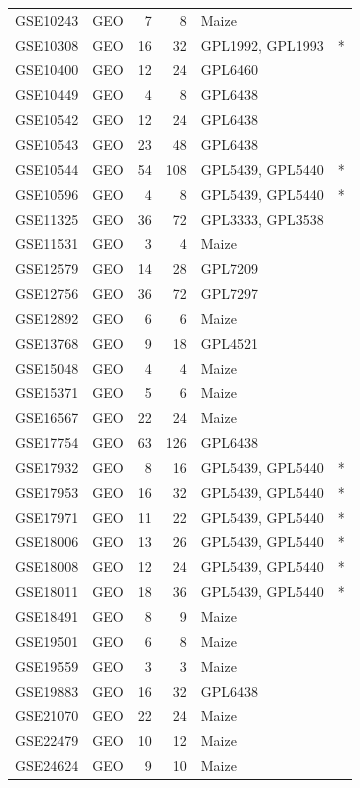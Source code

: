 \begin{ThreePartTable}
\begin{footnotesize}
\begin{longtable}{@{}|>{\centering\arraybackslash}p{2.5cm} | 
>{\centering\arraybackslash}p{1.5cm} rr 
>{\scriptsize\raggedright}p{2.5cm} c |@{}}
GSE10243 & GEO & 7 & 8 & Maize\tnote{2} & \\
GSE10308 & GEO & 16 & 32 & GPL1992, GPL1993 & * \\
GSE10400 & GEO & 12 & 24 & GPL6460 & \\
GSE10449 & GEO & 4 & 8 & GPL6438 & \\
GSE10542 & GEO & 12 & 24 & GPL6438 & \\
GSE10543 & GEO & 23 & 48 & GPL6438 & \\
GSE10544 & GEO & 54 & 108 & GPL5439, GPL5440 & * \\
GSE10596 & GEO & 4 & 8 & GPL5439, GPL5440 & * \\
GSE11325 & GEO & 36 & 72 & GPL3333, GPL3538 & \\
GSE11531 & GEO & 3 & 4 & Maize\tnote{2} & \\
GSE12579 & GEO & 14 & 28 & GPL7209 & \\
GSE12756 & GEO & 36 & 72 & GPL7297 & \\
GSE12892 & GEO & 6 & 6 & Maize\tnote{2} & \\
GSE13768 & GEO & 9 & 18 & GPL4521 & \\
GSE15048 & GEO & 4 & 4 & Maize\tnote{2} & \\
GSE15371 & GEO & 5 & 6 & Maize\tnote{2} & \\
GSE16567 & GEO & 22 & 24 & Maize\tnote{2} & \\
GSE17754 & GEO & 63 & 126 & GPL6438 & \\
GSE17932 & GEO & 8 & 16 & GPL5439, GPL5440 & * \\
GSE17953 & GEO & 16 & 32 & GPL5439, GPL5440 & * \\
GSE17971 & GEO & 11 & 22 & GPL5439, GPL5440 & * \\
GSE18006 & GEO & 13 & 26 & GPL5439, GPL5440 & * \\
GSE18008 & GEO & 12 & 24 & GPL5439, GPL5440 & * \\
GSE18011 & GEO & 18 & 36 & GPL5439, GPL5440 & * \\
GSE18491 & GEO & 8 & 9 & Maize\tnote{2} & \\
GSE19501 & GEO & 6 & 8 & Maize\tnote{2} & \\
GSE19559 & GEO & 3 & 3 & Maize\tnote{2} & \\
GSE19883 & GEO & 16 & 32 & GPL6438 & \\
GSE21070 & GEO & 22 & 24 & Maize\tnote{2} & \\
GSE22479 & GEO & 10 & 12 & Maize\tnote{2} & \\
GSE24624 & GEO & 9 & 10 & Maize\tnote{2} & \\

\end{longtable}
\end{footnotesize}
\end{ThreePartTable}
